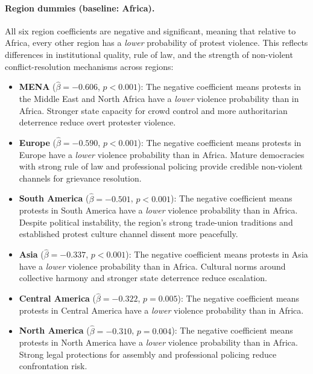 \documentclass[12pt,a4paper]{article}
\begin{document}
\paragraph{Region dummies (baseline: Africa).}
All six region coefficients are negative and significant, meaning that relative to Africa, every other region has a \emph{lower} probability of protest violence. This reflects differences in institutional quality, rule of law, and the strength of non-violent conflict-resolution mechanisms across regions:
\begin{itemize}
  \item \textbf{MENA} ($\hat{\beta} = -0.606$, $p < 0.001$): The negative coefficient means protests in the Middle East and North Africa have a \emph{lower} violence probability than in Africa. Stronger state capacity for crowd control and more authoritarian deterrence reduce overt protester violence.
  \item \textbf{Europe} ($\hat{\beta} = -0.590$, $p < 0.001$): The negative coefficient means protests in Europe have a \emph{lower} violence probability than in Africa. Mature democracies with strong rule of law and professional policing provide credible non-violent channels for grievance resolution.
  \item \textbf{South America} ($\hat{\beta} = -0.501$, $p < 0.001$): The negative coefficient means protests in South America have a \emph{lower} violence probability than in Africa. Despite political instability, the region's strong trade-union traditions and established protest culture channel dissent more peacefully.
  \item \textbf{Asia} ($\hat{\beta} = -0.337$, $p < 0.001$): The negative coefficient means protests in Asia have a \emph{lower} violence probability than in Africa. Cultural norms around collective harmony and stronger state deterrence reduce escalation.
  \item \textbf{Central America} ($\hat{\beta} = -0.322$, $p = 0.005$): The negative coefficient means protests in Central America have a \emph{lower} violence probability than in Africa.
  \item \textbf{North America} ($\hat{\beta} = -0.310$, $p = 0.004$): The negative coefficient means protests in North America have a \emph{lower} violence probability than in Africa. Strong legal protections for assembly and professional policing reduce confrontation risk.
\end{itemize}
\end{document}

